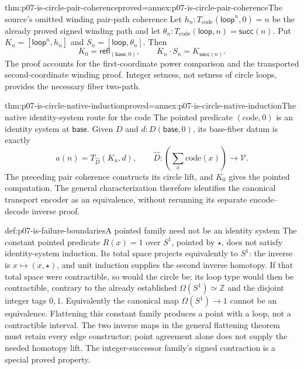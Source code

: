 \begin{hblemma}{thm:p07-is-circle-pair-coherence}{proved=annex:p07-is-circle-pair-coherence}{The source's omitted winding pair-path coherence}
Let \(h_n:T_{\mathrm{code}}(\mathsf{loop}^n,0)=n\) be the
already proved signed winding path and let
\(\theta_n:T_{\mathrm{code}}(\mathsf{loop},n)=\mathsf{succ}(n)\).
Put \(K_n=[\mathsf{loop}^n,h_n]\) and
\(S_n=[\mathsf{loop},\theta_n]\). Then
\[
K_0=\mathsf{refl}_{(\mathsf{base},0)},\qquad
K_n\cdot S_n=K_{\mathsf{succ}(n)}.
\]
The proof accounts for the first-coordinate power comparison and the
transported second-coordinate winding proof. Integer setness, not
setness of circle loops, provides the necessary fiber two-path.
\end{hblemma}

\begin{hbtheorem}{thm:p07-is-circle-native-induction}{proved=annex:p07-is-circle-native-induction}{The native identity-system route for the code}
The pointed predicate \((\mathrm{code},0)\) is an identity system at
\(\mathsf{base}\). Given \(D\) and \(d:D(\mathsf{base},0)\), its
base-fiber datum is exactly
\[
a(n)=T_{\widehat D}(K_n,d),
\qquad
\widehat D:\left(\sum_x\mathrm{code}(x)\right)\to\mathcal V.
\]
The preceding pair coherence constructs its circle lift, and \(K_0\)
gives the pointed computation. The general characterization therefore
identifies the canonical transport encoder as an equivalence, without
rerunning its separate encode--decode inverse proof.
\end{hbtheorem}

\begin{hbexample}{def:p07-is-failure-boundaries}{A pointed family need not be an identity system}
The constant pointed predicate \(R(x)=1\) over \(S^1\), pointed by
\(\star\), does not satisfy identity-system induction.
Its total space projects equivalently to \(S^1\): the inverse is
\(x\mapsto(x,\star)\), and unit induction supplies the second
inverse homotopy. If that total space were contractible, so would
the circle be; its loop type would then be contractible, contrary
to the already established \(\Omega(S^1)\simeq\mathbb Z\) and the
disjoint integer tags \(0,1\). Equivalently the canonical map
\(\Omega(S^1)\to1\) cannot be an equivalence.
Flattening this constant family produces a point with a loop, not a
contractible interval. The two inverse maps in the general flattening
theorem must retain every edge constructor; point agreement alone
does not supply the needed homotopy lift. The integer-successor
family's signed contraction is a special proved property.
\end{hbexample}


